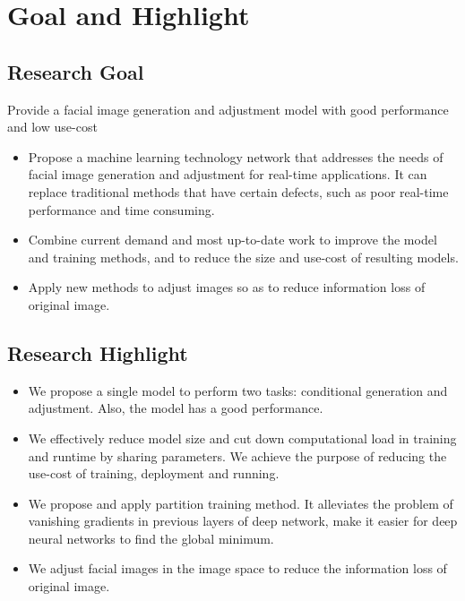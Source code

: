\section{Goal and Highlight}

\subsection{Research Goal}
Provide a
facial image generation and adjustment model
with good performance
and low use-cost

\begin{itemize}
\item
Propose a machine learning technology network that addresses the needs of facial image generation and adjustment for real-time applications.
It can replace traditional methods that have certain defects, such as poor real-time performance and time consuming.
\item
Combine current demand and most up-to-date work to improve the model and training methods,
    and to reduce the size and use-cost of resulting models.
\item
Apply new methods to adjust images so as to reduce information loss of original image.
\end{itemize}
\subsection{Research Highlight}
\begin{itemize}
\item
We propose a single model to perform two tasks: conditional generation and adjustment.
Also, the model has a good performance.
\item
We effectively reduce model size and cut down computational load in training and runtime by sharing parameters.
We achieve the purpose of reducing the use-cost of training, deployment and running.
\item
We propose and apply partition training method.
It alleviates the problem of vanishing gradients in previous layers of deep network,
    make it easier for deep neural networks to find the global minimum.

\item
We adjust facial images in the image space to reduce the information loss of original image.
\end{itemize}